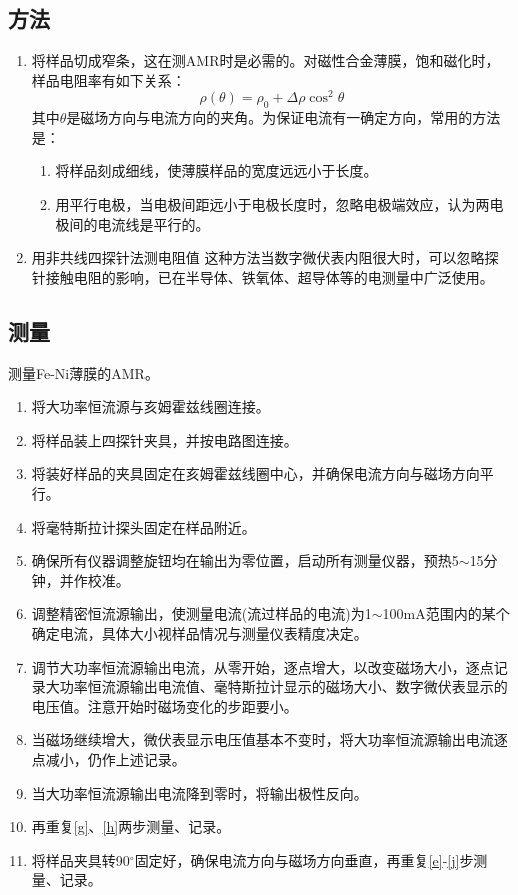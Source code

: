 \documentclass[a4paper]{article}
\begin{document}
\subsection{方法}
\begin{enumerate}
	\item 将样品切成窄条，这在测AMR时是必需的。对磁性合金薄膜，饱和磁化时，样品电阻率有如下关系：
	      \begin{equation*}
		      \rho(\theta) = \rho_0 + \Delta\rho\cos^2\theta
	      \end{equation*}
	      其中$\theta$是磁场方向与电流方向的夹角。为保证电流有一确定方向，常用的方法是：
	      \begin{enumerate}
		      \item 将样品刻成细线，使薄膜样品的宽度远远小于长度。
		      \item 用平行电极，当电极间距远小于电极长度时，忽略电极端效应，认为两电极间的电流线是平行的。
	      \end{enumerate}
	\item 用非共线四探针法测电阻值
	      这种方法当数字微伏表内阻很大时，可以忽略探针接触电阻的影响，已在半导体、铁氧体、超导体等的电测量中广泛使用。
\end{enumerate}
\subsection{测量}
测量Fe-Ni薄膜的AMR。
\begin{enumerate}
	\item 将大功率恒流源与亥姆霍兹线圈连接。\label{a}
	\item 将样品装上四探针夹具，并按电路图连接。\label{b}
	\item 将装好样品的夹具固定在亥姆霍兹线圈中心，并确保电流方向与磁场方向平行。\label{c}
	\item 将毫特斯拉计探头固定在样品附近。\label{d}
	\item 确保所有仪器调整旋钮均在输出为零位置，启动所有测量仪器，预热5$\sim$15分钟，并作校准。\label{e}
	\item 调整精密恒流源输出，使测量电流(流过样品的电流)为1$\sim$100mA范围内的某个确定电流，具体大小视样品情况与测量仪表精度决定。\label{f}
	\item 调节大功率恒流源输出电流，从零开始，逐点增大，以改变磁场大小，逐点记录大功率恒流源输出电流值、毫特斯拉计显示的磁场大小、数字微伏表显示的电压值。注意开始时磁场变化的步距要小。\label{g}
	\item 当磁场继续增大，微伏表显示电压值基本不变时，将大功率恒流源输出电流逐点减小，仍作上述记录。\label{h}
	\item 当大功率恒流源输出电流降到零时，将输出极性反向。\label{i}
	\item 再重复\ref{g}、\ref{h}两步测量、记录。\label{j}
	\item 将样品夹具转90$^{\circ}$固定好，确保电流方向与磁场方向垂直，再重复\ref{e}-\ref{j}步测量、记录。\label{k}

\end{enumerate}
\end{document}
